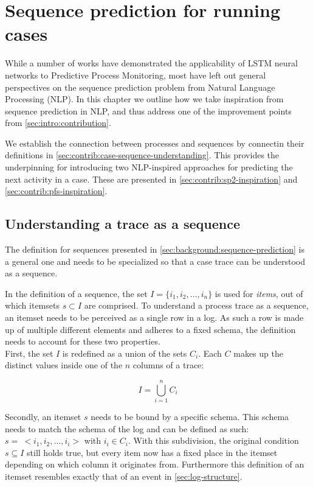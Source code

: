 \chapter{Sequence prediction for running cases}
\label{chap:taking-inspiration}
While a number of works have demonstrated the applicability of LSTM neural networks to Predictive Process Monitoring, most have left out general perspectives on the sequence prediction problem from Natural Language Processing (NLP). In this chapter we outline how we take inspiration from sequence prediction in NLP, and thus address one of the improvement points from \autoref{sec:intro:contribution}.

We establish the connection between processes and sequences by connectin their definitions in \autoref{sec:contrib:case-sequence-understanding}. This provides the underpinning for introducing two NLP-inspired approaches for predicting the next activity in a case. These are presented in \autoref{sec:contrib:sp2-inspiration} and \autoref{sec:contrib:pfs-inspiration}. 

\section{Understanding a trace as a sequence}
\label{sec:contrib:case-sequence-understanding} 
The definition for sequences presented in \autoref{sec:background:sequence-prediction} is a general one and needs to be specialized so that a case trace can be understood as a sequence.

In the definition of a sequence, the set $I=\{i_1, i_2, \dots, i_n\}$ is used for \textit{items}, out of which itemsets $s \subset I$ are comprised. To understand a process trace as a sequence, an itemset needs to be perceived as a single row in a log. As such a row is made up of multiple different elements and adheres to a fixed schema, the definition needs to account for these two properties.\\
\noindent First, the set $I$ is redefined as a union of the sets $C_i$. Each $C$ makes up the distinct values inside one of the $n$ columns of a trace:

$$I = \bigcup\limits_{i=1}^{n} C_{i}$$

Secondly, an itemset $s$ needs to be bound by a specific schema. This schema needs to match the schema of the log and can be defined as such: $s =\ <i_1, i_2, ..., i_i>$ with $i_i \in C_i$. With this subdivision, the original condition $s \subseteq I$ still holds true, but every item now has a fixed place in the itemset depending on which column it originates from. Furthermore this definition of an itemset resembles exactly that of an event in \autoref{sec:log-structure}.

